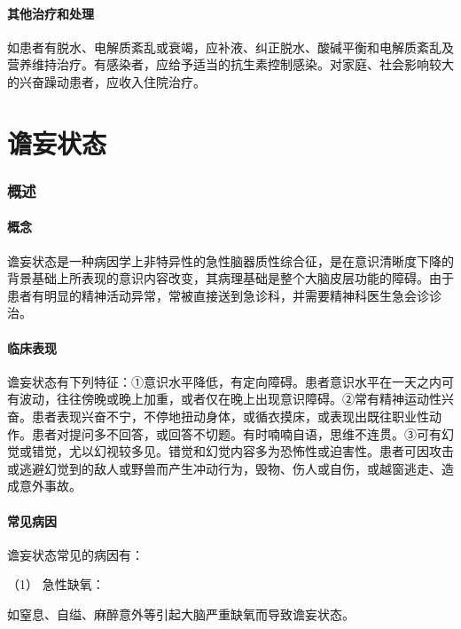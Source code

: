 \paragraph{其他治疗和处理}

如患者有脱水、电解质紊乱或衰竭，应补液、纠正脱水、酸碱平衡和电解质紊乱及营养维持治疗。有感染者，应给予适当的抗生素控制感染。对家庭、社会影响较大的兴奋躁动患者，应收入住院治疗。

\protect\hypertarget{text00044.html}{}{}

\section{谵妄状态}

\subsubsection{概述}

\paragraph{概念}

谵妄状态是一种病因学上非特异性的急性脑器质性综合征，是在意识清晰度下降的背景基础上所表现的意识内容改变，其病理基础是整个大脑皮层功能的障碍。由于患者有明显的精神活动异常，常被直接送到急诊科，并需要精神科医生急会诊诊治。

\paragraph{临床表现}

谵妄状态有下列特征：①意识水平降低，有定向障碍。患者意识水平在一天之内可有波动，往往傍晚或晚上加重，或者仅在晚上出现意识障碍。②常有精神运动性兴奋。患者表现兴奋不宁，不停地扭动身体，或循衣摸床，或表现出既往职业性动作。患者对提问多不回答，或回答不切题。有时喃喃自语，思维不连贯。③可有幻觉或错觉，尤以幻视较多见。错觉和幻觉内容多为恐怖性或迫害性。患者可因攻击或逃避幻觉到的敌人或野兽而产生冲动行为，毁物、伤人或自伤，或越窗逃走、造成意外事故。

\paragraph{常见病因}

谵妄状态常见的病因有：

\hypertarget{text00044.htmlux5cux23CHP1-18-2-1-3-1}{}
（1） 急性缺氧：

如窒息、自缢、麻醉意外等引起大脑严重缺氧而导致谵妄状态。

